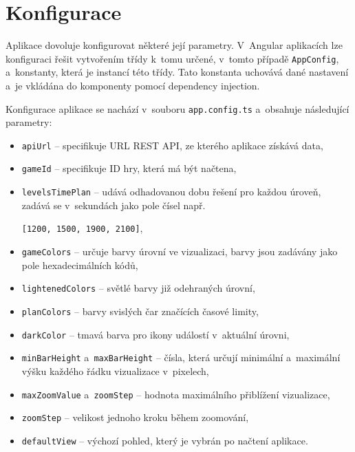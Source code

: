 \documentclass[
  digital, %
  oneside, %
  table,   %
  nolof,     %
  nolot,     %
  nocover
]{fithesis3}
\begin{document}
\section{Konfigurace} \label{config}
Aplikace dovoluje konfigurovat některé její parametry. V~Angular aplikacích lze konfiguraci řešit vytvořením třídy k~tomu určené, v~tomto případě \verb|AppConfig|, a~konstanty, která je instancí této třídy. Tato konstanta uchovává dané nastavení a~je vkládána do komponenty pomocí dependency injection.\par
Konfigurace aplikace se nachází v~souboru \verb|app.config.ts| a~obsahuje následující parametry:
\begin{itemize}
  \item \verb|apiUrl| – specifikuje URL REST API, ze kterého aplikace získává data,
  \item \verb|gameId| – specifikuje ID hry, která má být načtena,
  \item \verb|levelsTimePlan| – udává odhadovanou dobu řešení pro každou úroveň, zadává se v~sekundách jako pole čísel např.\par
  			\verb|[1200, 1500, 1900, 2100]|,
  \item \verb|gameColors| – určuje barvy úrovní ve vizualizaci, barvy jsou zadávány jako pole hexadecimálních kódů,
  \item \verb|lightenedColors| – světlé barvy již odehraných úrovní,
  \item \verb|planColors| – barvy svislých čar značících časové limity,
  \item \verb|darkColor| – tmavá barva pro ikony událostí v~aktuální úrovni,
  \item \verb|minBarHeight| a~\verb|maxBarHeight| – čísla, která určují minimální a~maximální výšku každého řádku vizualizace v~pixelech,
  \item \verb|maxZoomValue| a~\verb|zoomStep| – hodnota maximálního přiblížení vizualizace,
  \item \verb|zoomStep| – velikost jednoho kroku během zoomování,
  \item \verb|defaultView| – výchozí pohled, který je vybrán po načtení aplikace.
\end{itemize}
\end{document}
